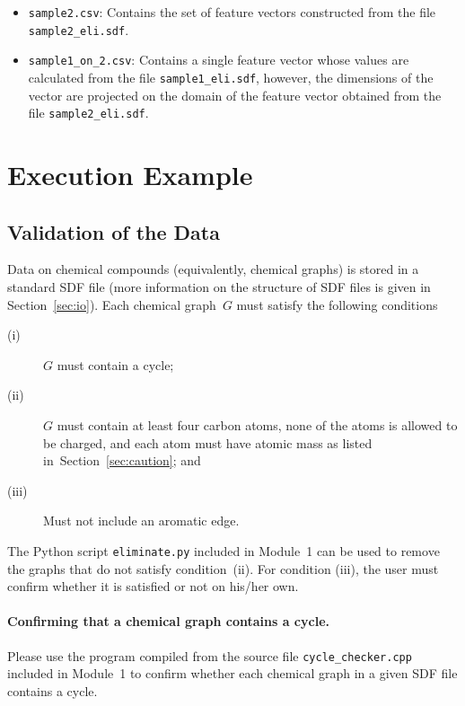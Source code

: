 \documentclass[11pt,titlepage,dvipdfmx,twoside]{book}
\newcommand{\secref}[1]{Section~\ref{sec:#1}}
\begin{document}
\begin{itemize}
\begin{itemize}
  {\tt eliminate.py} when invoked on the file {\tt sample2.sdf}.
  The contents of the files {\tt sample2.sdf} and {\tt sample2\_eli.sdf}
  should be identical.
  \item {\tt sample2.csv}: 
  Contains the set of feature vectors
  constructed from the file
  {\tt sample2\_eli.sdf}.
  \item {\tt sample1\_on\_2.csv}: 
  Contains a single feature vector whose values are calculated
  from the file
  {\tt sample1\_eli.sdf},
  however, the dimensions of the vector are projected 
  on the domain of the feature vector obtained from
  the file {\tt sample2\_eli.sdf}. 
  \end{itemize}
\end{itemize}

\clearpage
\section{Execution Example}
\label{sec:quick}

\subsection{Validation of the Data}
%
Data on chemical compounds (equivalently, chemical graphs) is stored in a standard SDF file
(more information on the structure of SDF files is given in \secref{io}).
Each chemical graph~$G$ 
must satisfy the following conditions
%
\begin{description}
\item[(i)] 
 $G$ must contain a cycle;
%
\item[(ii)] 
 $G$ must contain at least four carbon atoms,
 none of the atoms is allowed to be charged,
 and each atom must have atomic mass as listed
 in~\secref{caution}; and
\item[(iii)] Must not include an aromatic edge.
\end{description}
%

The Python script {\tt eliminate.py}
included in Module~1 can be used to 
remove the graphs that do not satisfy 
condition~(ii).%
For condition (iii),
the user must confirm whether it is satisfied or not
on his/her own. 

\paragraph{Confirming that a chemical graph contains a cycle.}
%
Please use the program compiled from the source file  
{\tt cycle\_checker.cpp}
included in Module~1 to confirm whether each chemical graph in a given
SDF file contains a cycle.
\end{document}
